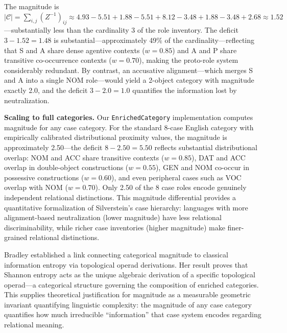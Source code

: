 \documentclass[
]{article}
\begin{document}
The magnitude is
\(|\mathcal{C}| = \sum_{i,j} (Z^{-1})_{ij} \approx 4.93 - 5.51 + 1.88 - 5.51 + 8.12 - 3.48 + 1.88 - 3.48 + 2.68 \approx 1.52\)---substantially
less than the cardinality 3 of the role inventory. The deficit
\(3 - 1.52 = 1.48\) is substantial---approximately 49\% of the
cardinality---reflecting that S and A share dense agentive contexts
(\(w = 0.85\)) and A and P share transitive co-occurrence contexts
(\(w = 0.70\)), making the proto-role system considerably redundant. By
contrast, an accusative alignment---which merges S and A into a single
NOM role---would yield a 2-object category with magnitude exactly 2.0,
and the deficit \(3 - 2.0 = 1.0\) quantifies the information lost by
neutralization.

\textbf{Scaling to full categories.} Our \texttt{EnrichedCategory}
implementation computes magnitude for any case category. For the
standard 8-case English category with empirically calibrated
distributional proximity values, the magnitude is approximately
2.50---the deficit \(8 - 2.50 = 5.50\) reflects substantial
distributional overlap: NOM and ACC share transitive contexts
(\(w = 0.85\)), DAT and ACC overlap in double-object constructions
(\(w = 0.55\)), GEN and NOM co-occur in possessive constructions
(\(w = 0.60\)), and even peripheral cases such as VOC overlap with NOM
(\(w = 0.70\)). Only 2.50 of the 8 case roles encode genuinely
independent relational distinctions. This magnitude differential
provides a quantitative formalization of Silverstein's
\citeyearpar{silverstein1976hierarchy} case hierarchy: languages with
more alignment-based neutralization (lower magnitude) have less
relational discriminability, while richer case inventories (higher
magnitude) make finer-grained relational distinctions.

Bradley \citeyearpar{bradley2021entropy} established a link connecting
categorical magnitude to classical information entropy via topological
operad derivations. Her result proves that Shannon entropy acts as the
unique algebraic derivation of a specific topological operad---a
categorical structure governing the composition of enriched categories.
This supplies theoretical justification for magnitude as a measurable
geometric invariant quantifying linguistic complexity: the magnitude of
any case category quantifies how much irreducible ``information'' that
case system encodes regarding relational meaning.
\end{document}
